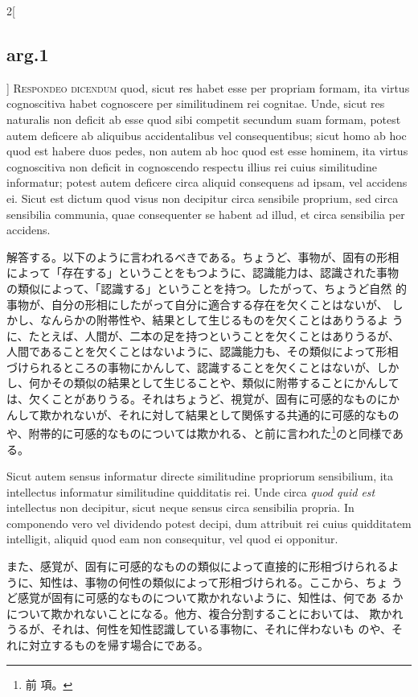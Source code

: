 \documentclass[paper=a4paper,fontsize=10pt,jafontsize=9pt,titlepage]{jlreq}
\begin{document}
\begin{paracol}{2}[\subsection{arg.1}]
{\scshape Respondeo dicendum} quod, sicut res habet esse
per propriam formam, ita virtus cognoscitiva habet cognoscere per
similitudinem rei cognitae. Unde, sicut res naturalis non deficit ab
esse quod sibi competit secundum suam formam, potest autem deficere ab
aliquibus accidentalibus vel consequentibus; sicut homo ab hoc quod est
habere duos pedes, non autem ab hoc quod est esse hominem, ita virtus
cognoscitiva non deficit in cognoscendo respectu illius rei cuius
similitudine informatur; potest autem deficere circa aliquid consequens
ad ipsam, vel accidens ei. Sicut est dictum quod visus non decipitur
circa sensibile proprium, sed circa sensibilia communia, quae
consequenter se habent ad illud, et circa sensibilia per accidens.

\switchcolumn

解答する。以下のように言われるべきである。ちょうど、事物が、固有の形相
によって「存在する」ということをもつように、認識能力は、認識された事物
の類似によって、「認識する」ということを持つ。したがって、ちょうど自然
的事物が、自分の形相にしたがって自分に適合する存在を欠くことはないが、
しかし、なんらかの附帯性や、結果として生じるものを欠くことはありうるよ
うに、たとえば、人間が、二本の足を持つということを欠くことはありうるが、
人間であることを欠くことはないように、認識能力も、その類似によって形相
づけられるところの事物にかんして、認識することを欠くことはないが、しか
し、何かその類似の結果として生じることや、類似に附帯することにかんして
は、欠くことがありうる。それはちょうど、視覚が、固有に可感的なものにか
んして欺かれないが、それに対して結果として関係する共通的に可感的なもの
や、附帯的に可感的なものについては欺かれる、と前に言われた\footnote{前
項。}のと同様である。

\switchcolumn*


Sicut autem sensus informatur directe similitudine propriorum
sensibilium, ita intellectus informatur similitudine quidditatis
rei. Unde circa {\itshape quod quid est} intellectus non decipitur,
sicut neque sensus circa sensibilia propria.  In componendo vero vel
dividendo potest decipi, dum attribuit rei cuius quidditatem
intelligit, aliquid quod eam non consequitur, vel quod ei opponitur.

\switchcolumn

また、感覚が、固有に可感的なものの類似によって直接的に形相づけられるよ
 うに、知性は、事物の何性の類似によって形相づけられる。ここから、ちょ
 うど感覚が固有に可感的なものについて欺かれないように、知性は、何であ
 るかについて欺かれないことになる。他方、複合分割することにおいては、
 欺かれうるが、それは、何性を知性認識している事物に、それに伴わないも
 のや、それに対立するものを帰す場合にである。


\end{paracol}
\end{document}
